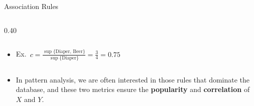 \documentclass[aspectratio=169, 11pt]{beamer}
\begin{document}
\begin{frame}{Association Rules}
\begin{columns}[T]
\begin{column}{0.40\textwidth}
\begin{tabular}{cl}
                \bottomrule
            \end{tabular}
            \vspace{7mm}
            \begin{itemize}
                \item Ex.\ $c = \frac{\sup\{\text{Diaper, Beer}\}}{\sup\{\text{Diaper}\}} = \frac{3}{4} = 0.75$
            \end{itemize}
        \end{column}
    \end{columns}
    \vspace{2mm}
    \small
    \begin{itemize}
        \item In pattern analysis, we are often interested in those rules that dominate the database, and these two metrics ensure the \textbf{popularity} and \textbf{correlation} of $X$ and $Y$.
    \end{itemize}
\end{frame}
\end{document}
